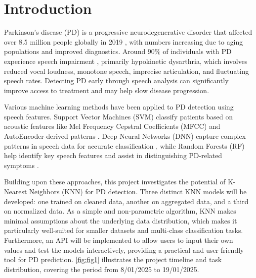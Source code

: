 \section{Introduction}

Parkinson's disease (PD) is a progressive neurodegenerative disorder that
affected over 8.5 million people globally in 2019 \cite{WHO2022}, with numbers
increasing due to aging populations and improved diagnostics. Around 90\% of
individuals with PD experience speech impairment \cite{IndianaParkinson},
primarily hypokinetic dysarthria, which involves reduced vocal loudness,
monotone speech, imprecise articulation, and fluctuating speech rates.
Detecting PD early through speech analysis can significantly improve access to
treatment and may help slow disease progression.

Various machine learning methods have been applied to PD detection using speech
features. Support Vector Machines (SVM) classify patients based on acoustic
features like Mel Frequency Cepstral Coefficients (MFCC) and
AutoEncoder-derived patterns \cite{SpringerSpeechProcessing}. Deep Neural
Networks (DNN) capture complex patterns in speech data for accurate
classification \cite{AIPDNN}, while Random Forests (RF) help identify key
speech features and assist in distinguishing PD-related symptoms
\cite{SpringerMLPD}.

Building upon these approaches, this project investigates the potential of
K-Nearest Neighbors (KNN) for PD detection. Three distinct KNN models will be
developed: one trained on cleaned data, another on aggregated data, and a third
on normalized data. As a simple and non-parametric algorithm, KNN makes minimal
assumptions about the underlying data distribution, which makes it particularly
well-suited for smaller datasets and multi-class classification tasks.
Furthermore, an API will be implemented to allow users to input their own
values and test the models interactively, providing a practical and
user-friendly tool for PD prediction. \cref{fig:fig1} illustrates the project
timeline and task distribution, covering the period from 8/01/2025 to
19/01/2025.

\usetikzlibrary{arrows, positioning, shapes.geometric,
	decorations.pathreplacing}


